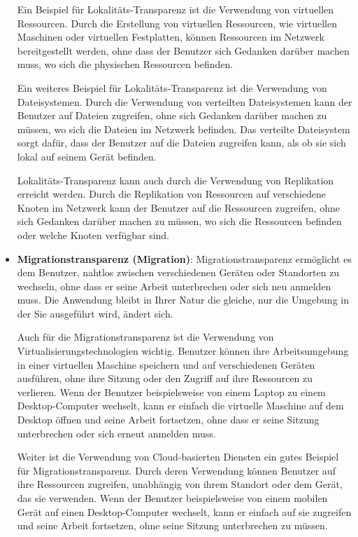 \documentclass[../vs-script-first-v01.tex]{subfiles}
\begin{document}
\begin{itemize}
        Ein Beispiel für Lokalitäts-Transparenz ist die Verwendung von virtuellen Ressourcen. Durch die Erstellung von virtuellen Ressourcen, wie virtuellen Maschinen oder virtuellen Festplatten, können Ressourcen im Netzwerk bereitgestellt werden, ohne dass der Benutzer sich Gedanken darüber machen muss, wo sich die physischen Ressourcen befinden.

        Ein weiteres Beispiel für Lokalitäts-Transparenz ist die Verwendung von Dateisystemen. Durch die Verwendung von verteilten Dateisystemen kann der Benutzer auf Dateien zugreifen, ohne sich Gedanken darüber machen zu müssen, wo sich die Dateien im Netzwerk befinden. Das verteilte Dateisystem sorgt dafür, dass der Benutzer auf die Dateien zugreifen kann, als ob sie sich lokal auf seinem Gerät befinden.

        Lokalitäts-Transparenz kann auch durch die Verwendung von Replikation erreicht werden. Durch die Replikation von Ressourcen auf verschiedene Knoten im Netzwerk kann der Benutzer auf die Ressourcen zugreifen, ohne sich Gedanken darüber machen zu müssen, wo sich die Ressourcen befinden oder welche Knoten verfügbar sind.

  \item \textbf{Migrationstransparenz (Migration)}: %
        Migrationstransparenz ermöglicht es dem Benutzer, nahtlos zwischen verschiedenen Geräten oder Standorten zu wechseln, ohne dass er seine Arbeit unterbrechen oder sich neu anmelden muss. Die Anwendung bleibt in Ihrer Natur die gleiche, nur die Umgebung in der Sie ausgeführt wird, ändert sich.

        Auch für die Migrationstransparenz ist die Verwendung von Virtualisierungstechnologien wichtig. Benutzer können ihre Arbeitsumgebung in einer virtuellen Maschine speichern und auf verschiedenen Geräten ausführen, ohne ihre Sitzung oder den Zugriff auf ihre Ressourcen zu verlieren. Wenn der Benutzer beispielsweise von einem Laptop zu einem Desktop-Computer wechselt, kann er einfach die virtuelle Maschine auf dem Desktop öffnen und seine Arbeit fortsetzen, ohne dass er seine Sitzung unterbrechen oder sich erneut anmelden muss.

        Weiter ist die Verwendung von Cloud-basierten Diensten ein gutes Beispiel für Migrationstransparenz. Durch deren Verwendung können Benutzer auf ihre Ressourcen zugreifen, unabhängig von ihrem Standort oder dem Gerät, das sie verwenden. Wenn der Benutzer beispielsweise von einem mobilen Gerät auf einen Desktop-Computer wechselt, kann er einfach auf sie zugreifen und seine Arbeit fortsetzen, ohne seine Sitzung unterbrechen zu müssen.


\end{itemize}
\end{document}
